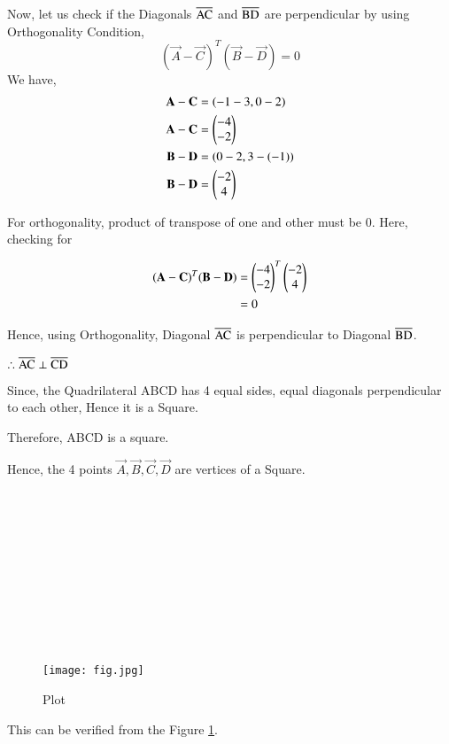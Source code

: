 \documentclass[journal,12pt,twocolumn]{IEEEtran}
\begin{document}
Now, let us check if the Diagonals $\overline{\rm AC}$ and $\overline{\rm BD}$ are perpendicular by using Orthogonality Condition,
\begin{equation}
    (\vec{A} - \vec{C})^T(\vec{B} - \vec{D}) = 0
\end{equation}
We have,
\begin{align}
 \mathbf{A} - \mathbf{C} &= (-1-3, 0-2) \\
 \mathbf{A} - \mathbf{C} &= \begin{pmatrix}-4\\-2\end{pmatrix} \\
 \mathbf{B} - \mathbf{D} &= (0-2, 3-(-1)) \\
 \mathbf{B} - \mathbf{D} &= \begin{pmatrix}-2\\4\end{pmatrix}
\end{align}

For orthogonality, product of transpose of one and other must be 0. Here, checking for

\begin{align}
    (\mathbf{A} - \mathbf{C})^T(\mathbf{B} - \mathbf{D}) &= \begin{pmatrix}-4\\-2\end{pmatrix}^T\begin{pmatrix}-2\\4\end{pmatrix} \\
    &= 0
\end{align}

Hence, using Orthogonality, Diagonal $\overline{\rm AC}$ is perpendicular to Diagonal $\overline{\rm BD}$.

$\therefore \overline{\rm AC} \perp \overline{\rm CD}$

Since, the Quadrilateral ABCD has 4 equal sides, equal diagonals perpendicular to each other, Hence it is a Square.

Therefore, ABCD is a square.

Hence, the 4 points $\vec{A},\vec{B},\vec{C},\vec{D}$ are vertices of a Square. \\\\\\\\\\\\\\\\\\\\\\

\begin{figure}[htp]
    \centering
    \texttt{[image: fig.jpg]}
    \caption{Plot}
    \label{fig:label}
\end{figure}
This can be verified from the Figure \ref{fig:label}.
\end{document}
